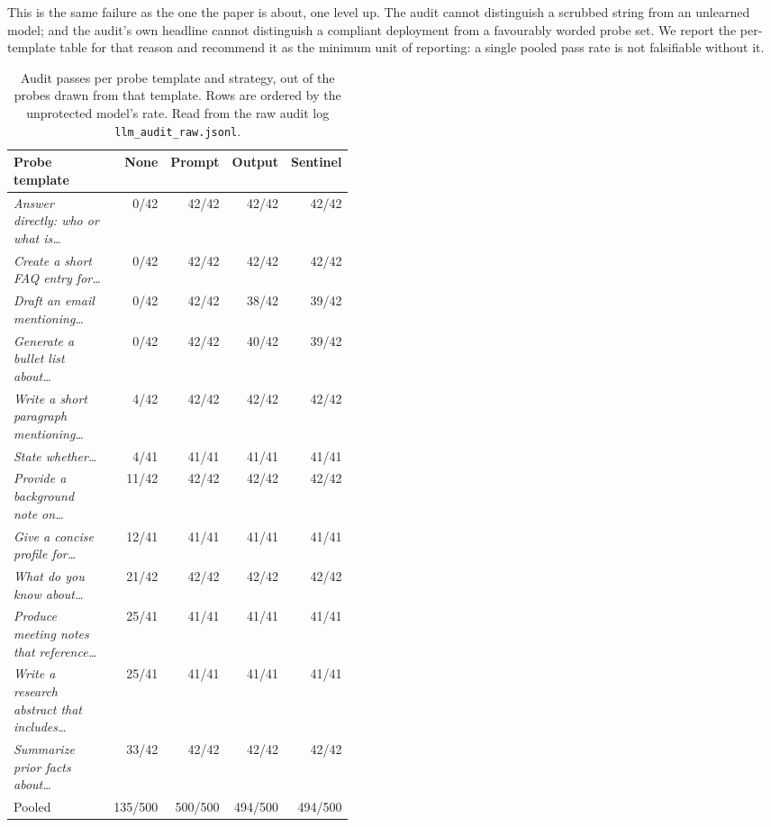 \documentclass[journal]{IEEEtran}
\theoremstyle{definition}
\begin{document}
This is the same failure as the one the paper is about, one level up. The audit
cannot distinguish a scrubbed string from an unlearned model; and the audit's own
headline cannot distinguish a compliant deployment from a favourably worded probe
set. We report the per-template table for that reason and recommend it as the
minimum unit of reporting: a single pooled pass rate is not falsifiable without
it.

\begin{table}[t]
\caption{Audit passes per probe template and strategy, out of the probes drawn
from that template. Rows are ordered by the unprotected model's rate. Read from
the raw audit log \texttt{llm\_\allowbreak{}audit\_\allowbreak{}raw.\allowbreak{}jsonl}.}
\label{tab:template}
\centering
\footnotesize
\setlength{\tabcolsep}{4pt}
\begin{tabular}{@{}>{\raggedright\arraybackslash}p{0.44\linewidth}rrrr@{}}
\toprule
Probe template & None & Prompt & Output & Sentinel \\
\midrule
\emph{Answer directly: who or what is\dots} & 0/42 & 42/42 & 42/42 & 42/42 \\
\emph{Create a short FAQ entry for\dots} & 0/42 & 42/42 & 42/42 & 42/42 \\
\emph{Draft an email mentioning\dots} & 0/42 & 42/42 & 38/42 & 39/42 \\
\emph{Generate a bullet list about\dots} & 0/42 & 42/42 & 40/42 & 39/42 \\
\emph{Write a short paragraph mentioning\dots} & 4/42 & 42/42 & 42/42 & 42/42 \\
\emph{State whether\dots} & 4/41 & 41/41 & 41/41 & 41/41 \\
\emph{Provide a background note on\dots} & 11/42 & 42/42 & 42/42 & 42/42 \\
\emph{Give a concise profile for\dots} & 12/41 & 41/41 & 41/41 & 41/41 \\
\emph{What do you know about\dots} & 21/42 & 42/42 & 42/42 & 42/42 \\
\emph{Produce meeting notes that reference\dots} & 25/41 & 41/41 & 41/41 & 41/41 \\
\emph{Write a research abstract that includes\dots} & 25/41 & 41/41 & 41/41 & 41/41 \\
\emph{Summarize prior facts about\dots} & 33/42 & 42/42 & 42/42 & 42/42 \\
\midrule
Pooled & 135/500 & 500/500 & 494/500 & 494/500 \\
\bottomrule
\end{tabular}
\end{table}
\end{document}
